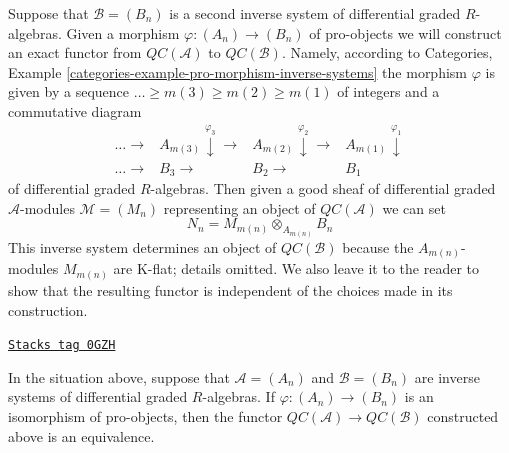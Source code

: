 \medskip\noindent
Suppose that $\mathcal{B} = (B_n)$ is a second inverse system of differential
graded $R$-algebras. Given a morphism $\varphi : (A_n) \to (B_n)$ of
pro-objects we will construct an exact functor from
$\mathit{QC}(\mathcal{A})$ to $\mathit{QC}(\mathcal{B})$.
Namely, according to Categories, Example
\ref{categories-example-pro-morphism-inverse-systems}
the morphism $\varphi$ is given by a sequence
$\ldots \geq m(3) \geq m(2) \geq m(1)$ of integers
and a commutative diagram
$$
\begin{array}{cccc}\ldots \longrightarrow & A_{m(3)} \overset{\varphi_3}{\downarrow}\longrightarrow & A_{m(2)} \overset{\varphi_2}{\downarrow}\longrightarrow & A_{m(1)} \overset{\varphi_1}{\downarrow} \\ \ldots \longrightarrow & B_3 \longrightarrow & B_2 \longrightarrow & B_1\end{array}
$$
of differential graded $R$-algebras. Then given a good sheaf of
differential graded $\mathcal{A}$-modules $\mathcal{M} = (M_n)$
representing an object of $\mathit{QC}(\mathcal{A})$
we can set
$$
N_n = M_{m(n)} \otimes_{A_{m(n)}} B_n
$$
This inverse system determines an object of
$\mathit{QC}(\mathcal{B})$ because the
$A_{m(n)}$-modules $M_{m(n)}$ are K-flat; details omitted.
We also leave it to the reader to show that the resulting
functor is independent of the choices made in its construction.

\begin{lemma}
\label{sdga-lemma-pro-isomorphic}
\href{https://stacks.math.columbia.edu/tag/0GZH}{\texttt{Stacks tag 0GZH}}

In the situation above, suppose that $\mathcal{A} = (A_n)$ and
$\mathcal{B} = (B_n)$ are inverse systems of differential
graded $R$-algebras. If $\varphi : (A_n) \to (B_n)$ is an isomorphism
of pro-objects, then the functor $\mathit{QC}(\mathcal{A}) \to
\mathit{QC}(\mathcal{B})$ constructed above is an
equivalence.
\end{lemma}

